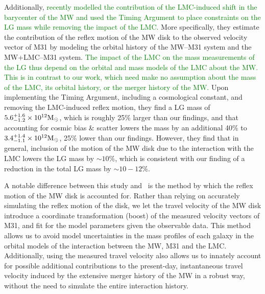 \documentclass[twocolumn]{aastex631}
\newcommand{\add}[1]{\textcolor{green}{#1}}
\begin{document}
Additionally, \cite{Benisty2022} \add{recently modelled the contribution of the
LMC-induced shift in the barycenter of the MW and used the Timing Argument to
place constraints on the LG mass while removing the impact of the LMC.}
More specifically, they estimate the contribution of the reflex motion of the
MW disk to the observed velocity vector of M31 by modeling the orbital history
of the MW--M31 system and the MW+LMC--M31 system.
\add{The impact of the LMC on the mass measurements of the LG thus depend on the
orbital and mass models of the LMC about the MW.
This is in contrast to our work, which need make no assumption about the mass of
the LMC, its orbital history, or the merger history of the MW.}
Upon implementing the Timing Argument, including a cosmological constant,
and removing the LMC-induced reflex motion,
they find a LG mass of $5.6^{+1.6}_{-1.2}\times10^{12}\mathrm{M}_\odot$, which is roughly
25\% larger than our findings, and that accounting for cosmic bias \& scatter
lowers the mass by an additional 40\% to $3.4^{+1.4}_{-1.1}\times10^{12}\mathrm{M}_\odot$,
25\% lower than our findings.
However, they find that in general, inclusion of the motion of the MW disk due
to the interaction with the LMC lowers the LG mass by $\sim10\%$, which is
consistent with our finding of a reduction in the total LG mass by $\sim10-12\%$.

A notable difference between this study and~\cite{Benisty2022} is the method by
which the reflex motion of the MW disk is accounted for.
Rather than relying on accurately simulating the reflex motion of the disk, we
let the travel velocity of the MW disk introduce a coordinate transformation
(boost) of the measured velocity vectors of M31, and fit for the model
parameters given the observable data.
This method allows us to avoid model uncertainties in the mass profiles of each
galaxy in the orbital models of the interaction between the MW, M31 and the LMC.
Additionally, using the measured travel velocity also allows us to innately
account for possible additional contributions to the present-day, instantaneous
travel velocity induced by the extensive merger history of the MW in a robust
way, without the need to simulate the entire interaction history.
\end{document}
